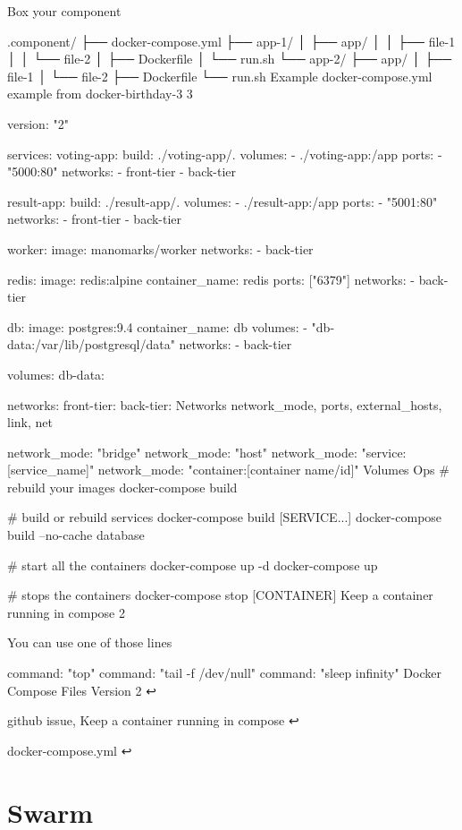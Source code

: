 Box your component

.component/
├── docker-compose.yml
├── app-1/
│   ├── app/
│   │   ├── file-1
│   │   └── file-2
│   ├── Dockerfile
│   └── run.sh
└── app-2/
    ├── app/
    │   ├── file-1
    │   └── file-2
    ├── Dockerfile
    └── run.sh
Example
docker-compose.yml example from docker-birthday-3 3

version: "2"

services:
  voting-app:
    build: ./voting-app/.
    volumes:
      - ./voting-app:/app
    ports:
      - "5000:80"
    networks:
      - front-tier
      - back-tier

  result-app:
    build: ./result-app/.
    volumes:
      - ./result-app:/app
    ports:
      - "5001:80"
    networks:
      - front-tier
      - back-tier

  worker:
    image: manomarks/worker
    networks:
      - back-tier

  redis:
    image: redis:alpine
    container_name: redis
    ports: ["6379"]
    networks:
      - back-tier

  db:
    image: postgres:9.4
    container_name: db
    volumes:
      - "db-data:/var/lib/postgresql/data"
    networks:
      - back-tier

volumes:
  db-data:

networks:
  front-tier:
  back-tier:
Networks
network_mode, ports, external_hosts, link, net

network_mode: "bridge"
network_mode: "host"
network_mode: "service:[service_name]"
network_mode: "container:[container name/id]"
Volumes
Ops
# rebuild your images
docker-compose build

# build or rebuild services
docker-compose build [SERVICE...]
docker-compose build --no-cache database


# start all the containers
docker-compose up -d
docker-compose up

# stops the containers
docker-compose stop [CONTAINER]
Keep a container running in compose 2

You can use one of those lines

command: "top"
command: "tail -f /dev/null"
command: "sleep infinity"
Docker Compose Files Version 2 ↩

github issue, Keep a container running in compose ↩

docker-compose.yml ↩

\section{Swarm}

